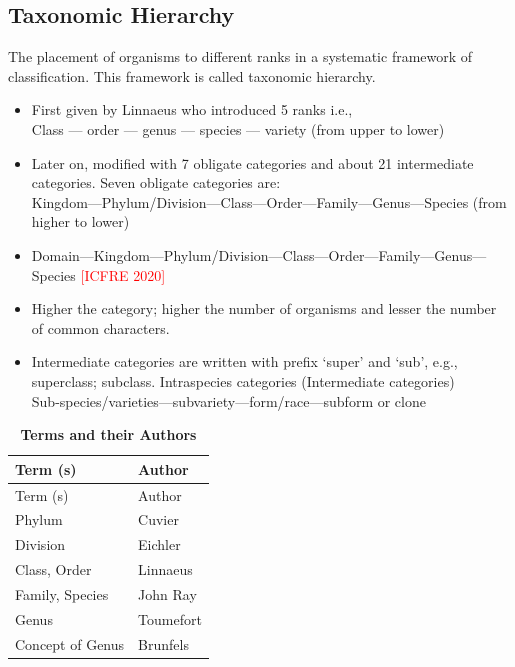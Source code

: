 \documentclass[
]{book}
\providecommand{\tightlist}{%
  \setlength{\itemsep}{0pt}\setlength{\parskip}{0pt}}
\begin{document}
\hypertarget{taxonomic-hierarchy}{%
\subsection{Taxonomic Hierarchy}\label{taxonomic-hierarchy}}

The placement of organisms to different ranks in a systematic framework of classification. This framework is called taxonomic hierarchy.

\begin{itemize}
\tightlist
\item
  First given by Linnaeus who introduced 5 ranks i.e.,\\
  Class --- order --- genus --- species --- variety (from upper to lower)
\item
  Later on, modified with 7 obligate categories and about 21 intermediate categories. Seven obligate categories are:\\
  Kingdom---Phylum/Division---Class---Order---Family---Genus---Species (from higher to lower)
\item
  Domain---Kingdom---Phylum/Division---Class---Order---Family---Genus---Species \textcolor{red}{[ICFRE 2020]}
\item
  Higher the category; higher the number of organisms and lesser the number of common characters.\\
\item
  Intermediate categories are written with prefix `super' and `sub', e.g., superclass; subclass. Intraspecies categories (Intermediate categories)\\
  Sub-species/varieties---subvariety---form/race---subform or clone
\end{itemize}

\begin{longtable}[]{@{}ll@{}}
\caption{\textbf{\label{tab:term-author} Terms and their Authors}}\tabularnewline
\toprule
Term (s) & Author \\
\midrule
\endfirsthead
\toprule
Term (s) & Author \\
\midrule
\endhead
Phylum & Cuvier \\
Division & Eichler \\
Class, Order & Linnaeus \\
Family, Species & John Ray \\
Genus & Toumefort \\
Concept of Genus & Brunfels \\
\bottomrule
\end{longtable}
\end{document}
